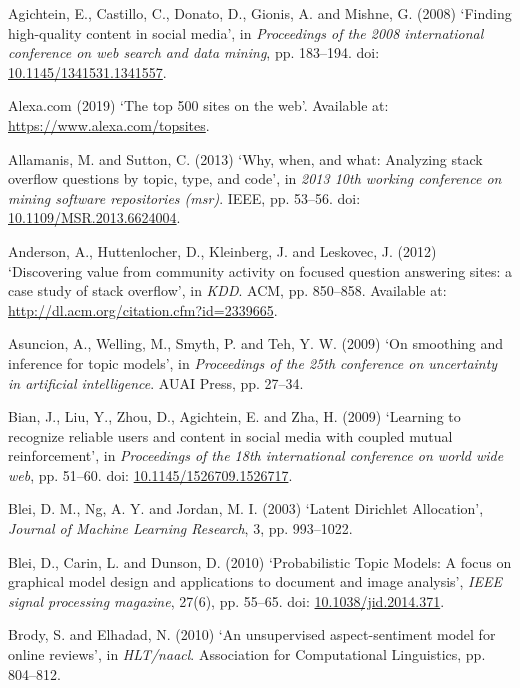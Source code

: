 \documentclass[11pt,preprint, authoryear]{article}
\begin{document}
\hypertarget{refs}{}
\hypertarget{ref-Agichtein2008}{}
Agichtein, E., Castillo, C., Donato, D., Gionis, A. and Mishne, G.
(2008) `Finding high-quality content in social media', in
\emph{Proceedings of the 2008 international conference on web search and
data mining}, pp. 183--194. doi:
\href{https://doi.org/10.1145/1341531.1341557}{10.1145/1341531.1341557}.

\hypertarget{ref-Alexa.com2019}{}
Alexa.com (2019) `The top 500 sites on the web'. Available at:
\url{https://www.alexa.com/topsites}.

\hypertarget{ref-Allamanis2013}{}
Allamanis, M. and Sutton, C. (2013) `Why, when, and what: Analyzing
stack overflow questions by topic, type, and code', in \emph{2013 10th
working conference on mining software repositories (msr)}. IEEE, pp.
53--56. doi:
\href{https://doi.org/10.1109/MSR.2013.6624004}{10.1109/MSR.2013.6624004}.

\hypertarget{ref-Anderson2012}{}
Anderson, A., Huttenlocher, D., Kleinberg, J. and Leskovec, J. (2012)
`Discovering value from community activity on focused question answering
sites: a case study of stack overflow', in \emph{KDD}. ACM, pp.
850--858. Available at: \url{http://dl.acm.org/citation.cfm?id=2339665}.

\hypertarget{ref-Asuncion2009}{}
Asuncion, A., Welling, M., Smyth, P. and Teh, Y. W. (2009) `On smoothing
and inference for topic models', in \emph{Proceedings of the 25th
conference on uncertainty in artificial intelligence}. AUAI Press, pp.
27--34.

\hypertarget{ref-Bian2009}{}
Bian, J., Liu, Y., Zhou, D., Agichtein, E. and Zha, H. (2009) `Learning
to recognize reliable users and content in social media with coupled
mutual reinforcement', in \emph{Proceedings of the 18th international
conference on world wide web}, pp. 51--60. doi:
\href{https://doi.org/10.1145/1526709.1526717}{10.1145/1526709.1526717}.

\hypertarget{ref-Blei2003}{}
Blei, D. M., Ng, A. Y. and Jordan, M. I. (2003) `Latent Dirichlet
Allocation', \emph{Journal of Machine Learning Research}, 3, pp.
993--1022.

\hypertarget{ref-Blei2010}{}
Blei, D., Carin, L. and Dunson, D. (2010) `Probabilistic Topic Models: A
focus on graphical model design and applications to document and image
analysis', \emph{IEEE signal processing magazine}, 27(6), pp. 55--65.
doi: \href{https://doi.org/10.1038/jid.2014.371}{10.1038/jid.2014.371}.

\hypertarget{ref-Brody2010}{}
Brody, S. and Elhadad, N. (2010) `An unsupervised aspect-sentiment model
for online reviews', in \emph{HLT/naacl}. Association for Computational
Linguistics, pp. 804--812.
\end{document}
